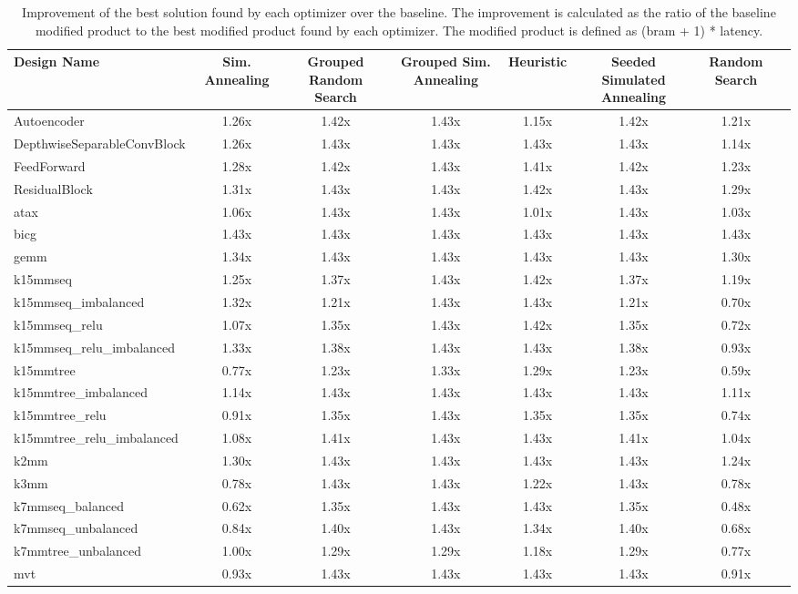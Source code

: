 \begin{table}[th]
\caption{Improvement of the best solution found by each optimizer over the baseline. The improvement is calculated as the ratio of the baseline modified product to the best modified product found by each optimizer. The modified product is defined as (bram + 1) * latency.}
\label{tab:improvement}
\begin{tabular}{lccccccc}
\toprule
Design Name & Sim. Annealing & Grouped Random Search & Grouped Sim. Annealing & Heuristic & Seeded Simulated Annealing & Random Search \\
\midrule
Autoencoder & 1.26x & 1.42x & 1.43x & 1.15x & 1.42x & 1.21x \\
DepthwiseSeparableConvBlock & 1.26x & 1.43x & 1.43x & 1.43x & 1.43x & 1.14x \\
FeedForward & 1.28x & 1.42x & 1.43x & 1.41x & 1.42x & 1.23x \\
ResidualBlock & 1.31x & 1.43x & 1.43x & 1.42x & 1.43x & 1.29x \\
atax & 1.06x & 1.43x & 1.43x & 1.01x & 1.43x & 1.03x \\
bicg & 1.43x & 1.43x & 1.43x & 1.43x & 1.43x & 1.43x \\
gemm & 1.34x & 1.43x & 1.43x & 1.43x & 1.43x & 1.30x \\
k15mmseq & 1.25x & 1.37x & 1.43x & 1.42x & 1.37x & 1.19x \\
k15mmseq\_imbalanced & 1.32x & 1.21x & 1.43x & 1.43x & 1.21x & 0.70x \\
k15mmseq\_relu & 1.07x & 1.35x & 1.43x & 1.42x & 1.35x & 0.72x \\
k15mmseq\_relu\_imbalanced & 1.33x & 1.38x & 1.43x & 1.43x & 1.38x & 0.93x \\
k15mmtree & 0.77x & 1.23x & 1.33x & 1.29x & 1.23x & 0.59x \\
k15mmtree\_imbalanced & 1.14x & 1.43x & 1.43x & 1.43x & 1.43x & 1.11x \\
k15mmtree\_relu & 0.91x & 1.35x & 1.43x & 1.35x & 1.35x & 0.74x \\
k15mmtree\_relu\_imbalanced & 1.08x & 1.41x & 1.43x & 1.43x & 1.41x & 1.04x \\
k2mm & 1.30x & 1.43x & 1.43x & 1.43x & 1.43x & 1.24x \\
k3mm & 0.78x & 1.43x & 1.43x & 1.22x & 1.43x & 0.78x \\
k7mmseq\_balanced & 0.62x & 1.35x & 1.43x & 1.43x & 1.35x & 0.48x \\
k7mmseq\_unbalanced & 0.84x & 1.40x & 1.43x & 1.34x & 1.40x & 0.68x \\
k7mmtree\_unbalanced & 1.00x & 1.29x & 1.29x & 1.18x & 1.29x & 0.77x \\
mvt & 0.93x & 1.43x & 1.43x & 1.43x & 1.43x & 0.91x \\
\bottomrule
\end{tabular}
\end{table}
